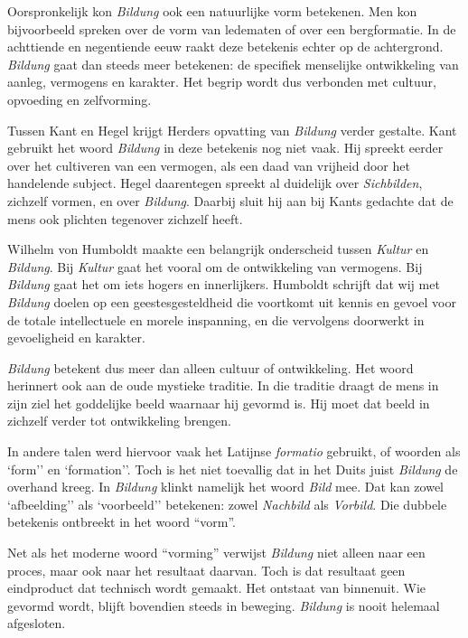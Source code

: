 Oorspronkelijk kon \textit{Bildung} ook een natuurlijke vorm betekenen. Men kon bijvoorbeeld spreken over de vorm van ledematen of over een bergformatie. In de achttiende en negentiende eeuw raakt deze betekenis echter op de achtergrond. \textit{Bildung} gaat dan steeds meer betekenen: de specifiek menselijke ontwikkeling van aanleg, vermogens en karakter. Het begrip wordt dus verbonden met cultuur, opvoeding en zelfvorming.

Tussen Kant en Hegel krijgt Herders opvatting van \textit{Bildung} verder gestalte. Kant gebruikt het woord \textit{Bildung} in deze betekenis nog niet vaak. Hij spreekt eerder over het cultiveren van een vermogen, als een daad van vrijheid door het handelende subject. Hegel daarentegen spreekt al duidelijk over \textit{Sichbilden}, zichzelf vormen, en over \textit{Bildung}. Daarbij sluit hij aan bij Kants gedachte dat de mens ook plichten tegenover zichzelf heeft.

Wilhelm von Humboldt maakte een belangrijk onderscheid tussen \textit{Kultur} en \textit{Bildung}. Bij \textit{Kultur} gaat het vooral om de ontwikkeling van vermogens. Bij \textit{Bildung} gaat het om iets hogers en innerlijkers. Humboldt schrijft dat wij met \textit{Bildung} doelen op een geestesgesteldheid die voortkomt uit kennis en gevoel voor de totale intellectuele en morele inspanning, en die vervolgens doorwerkt in gevoeligheid en karakter.

\textit{Bildung} betekent dus meer dan alleen cultuur of ontwikkeling. Het woord herinnert ook aan de oude mystieke traditie. In die traditie draagt de mens in zijn ziel het goddelijke beeld waarnaar hij gevormd is. Hij moet dat beeld in zichzelf verder tot ontwikkeling brengen.

In andere talen werd hiervoor vaak het Latijnse \textit{formatio} gebruikt, of woorden als `form'' en `formation''. Toch is het niet toevallig dat in het Duits juist \textit{Bildung} de overhand kreeg. In \textit{Bildung} klinkt namelijk het woord \textit{Bild} mee. Dat kan zowel `afbeelding'' als `voorbeeld'' betekenen: zowel \textit{Nachbild} als \textit{Vorbild}. Die dubbele betekenis ontbreekt in het woord ``vorm''.

Net als het moderne woord ``vorming'' verwijst \textit{Bildung} niet alleen naar een proces, maar ook naar het resultaat daarvan. Toch is dat resultaat geen eindproduct dat technisch wordt gemaakt. Het ontstaat van binnenuit. Wie gevormd wordt, blijft bovendien steeds in beweging. \textit{Bildung} is nooit helemaal afgesloten.

